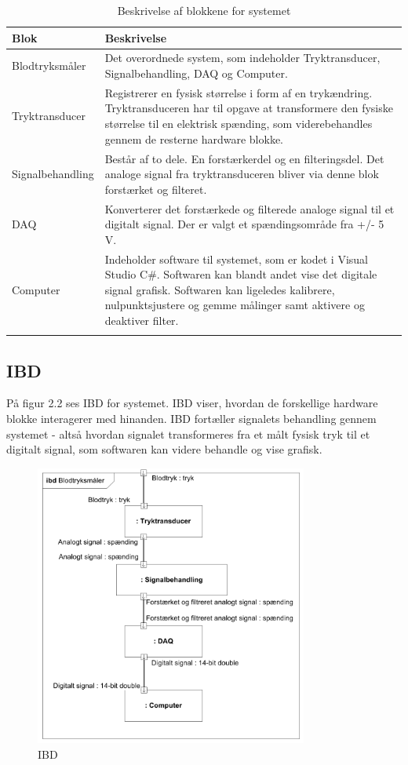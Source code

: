 \begin{longtabu} to 
	\textbf{Blok} &	\textbf{Beskrivelse} \\[-1ex]
	\midrule
	Blodtryksmåler & Det overordnede system, som indeholder Tryktransducer, Signalbehandling, DAQ og Computer.\\[-1ex]
	Tryktransducer & Registrerer en fysisk størrelse i form af en trykændring. Tryktransduceren har til opgave at transformere den fysiske størrelse til en elektrisk spænding, som viderebehandles gennem de resterne hardware blokke.  \\[-1ex]
	Signalbehandling & Består af to dele. En forstærkerdel og en filteringsdel. Det analoge signal fra tryktransduceren bliver via denne blok forstærket og filteret.\\[-1ex]
	DAQ & Konverterer det forstærkede og filterede analoge signal til et digitalt signal. Der er valgt et spændingsområde fra +/- 5 V.\\[-1ex]
	Computer & Indeholder software til systemet, som er kodet i Visual Studio C\#. Softwaren kan blandt andet vise det digitale signal grafisk. Softwaren kan ligeledes kalibrere, nulpunktsjustere og gemme målinger samt aktivere og deaktiver filter.\\[-1ex]
	\caption{Beskrivelse af blokkene for systemet}
	\end{longtabu}
	
\subsection{IBD}
På figur 2.2 ses IBD for systemet. IBD viser, hvordan de forskellige hardware blokke interagerer med hinanden. IBD fortæller signalets behandling gennem systemet - altså hvordan signalet transformeres fra et målt fysisk tryk til et digitalt signal, som softwaren kan videre behandle og vise grafisk. 

\begin{figure}[H]
	\centering
	\includegraphics[width=0.8\textwidth]{Figurer/Snip20151209_72}
	\caption{IBD}
	\label{fig:IBD}
\end{figure}

